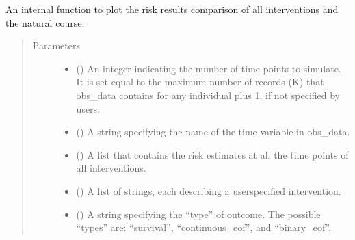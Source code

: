\documentclass[letterpaper,10pt,english]{sphinxmanual}
\begin{document}
\begin{fulllineitems}
\label{\detokenize{Specifications/Output:pygformula.plot.plot_interventions}}
\sphinxAtStartPar
An internal function to plot the risk results comparison of all interventions and the natural course.
\begin{quote}\begin{description}
\item[{Parameters}] \leavevmode\begin{itemize}
\item {} 
\sphinxAtStartPar
{} () \textendash{} An integer indicating the number of time points to simulate. It is set equal to the maximum number of records (K)
that obs\_data contains for any individual plus 1, if not specified by users.

\item {} 
\sphinxAtStartPar
{} () \textendash{} A string specifying the name of the time variable in obs\_data.

\item {} 
\sphinxAtStartPar
{} () \textendash{} A list that contains the risk estimates at all the time points of all interventions.

\item {} 
\sphinxAtStartPar
{} () \textendash{} A list of strings, each describing a user\sphinxhyphen{}specified intervention.

\item {} 
\sphinxAtStartPar
{} () \textendash{} A string specifying the “type” of outcome. The possible “types” are: “survival”, “continuous\_eof”, and “binary\_eof”.


\end{itemize}
\end{description}
\end{quote}
\end{fulllineitems}
\end{document}
